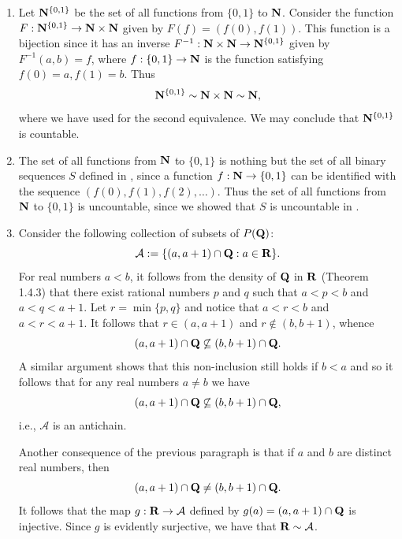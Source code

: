 \documentclass{lew98_solutions}
\begin{document}
\begin{solution}
    \begin{enumerate}
        \item Let \( \mathbf{N}^{\{0,1\}} \) be the set of all functions from \( \{ 0, 1 \} \) to \( \mathbf{N} \). Consider the function \( F : \mathbf{N}^{\{0,1\}} \to \mathbf{N} \times \mathbf{N} \) given by \( F(f) = (f(0), f(1)) \). This function is a bijection since it has an inverse \( F^{-1} : \mathbf{N} \times \mathbf{N} \to \mathbf{N}^{\{0,1\}} \) given by \( F^{-1}(a, b) = f \), where \( f : \{ 0, 1 \} \to \mathbf{N} \) is the function satisfying \( f(0) = a, f(1) = b \). Thus
        \[
            \mathbf{N}^{\{0,1\}} \sim \mathbf{N} \times \mathbf{N} \sim \mathbf{N},
        \]
        where we have used  for the second equivalence. We may conclude that \( \mathbf{N}^{\{0,1\}} \) is countable.

        \item The set of all functions from \( \mathbf{N} \) to \( \{ 0, 1 \} \) is nothing but the set of all binary sequences \( S \) defined in , since a function \( f : \mathbf{N} \to \{ 0, 1 \} \) can be identified with the sequence \( (f(0), f(1), f(2), \ldots) \). Thus the set of all functions from \( \mathbf{N} \) to \( \{ 0, 1 \} \) is uncountable, since we showed that \( S \) is uncountable in .

        \item Consider the following collection of subsets of \( P(\mathbf{Q}) \):
        \[
            \mathcal{A} := \{ (a, a + 1) \cap \mathbf{Q} : a \in \mathbf{R} \}.
        \]
        For real numbers \( a < b \), it follows from the density of \( \mathbf{Q} \) in \( \mathbf{R} \) (Theorem 1.4.3) that there exist rational numbers \( p \) and \( q \) such that \( a < p < b \) and \( a < q < a + 1 \). Let \( r = \min \{ p, q \} \) and notice that \( a < r < b \) and \( a < r < a + 1 \). It follows that \( r \in (a, a + 1) \) and \( r \not\in (b, b + 1) \), whence
        \[
            (a, a + 1) \cap \mathbf{Q} \not\subseteq (b, b + 1) \cap \mathbf{Q}.
        \]
        A similar argument shows that this non-inclusion still holds if \( b < a \) and so it follows that for any real numbers \( a \neq b \) we have
        \[
            (a, a + 1) \cap \mathbf{Q} \not\subseteq (b, b + 1) \cap \mathbf{Q},
        \]
        i.e., \( \mathcal{A} \) is an antichain.

        Another consequence of the previous paragraph is that if \( a \) and \( b \) are distinct real numbers, then
        \[
            (a, a + 1) \cap \mathbf{Q} \neq (b, b + 1) \cap \mathbf{Q}.
        \]
        It follows that the map \( g : \mathbf{R} \to \mathcal{A} \) defined by \( g(a) = (a, a + 1) \cap \mathbf{Q} \) is injective. Since \( g \) is evidently surjective, we have that \( \mathbf{R} \sim \mathcal{A} \).


\end{enumerate}
\end{solution}
\end{document}
